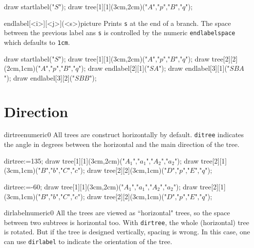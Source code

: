 \documentclass[11pt,a4paper,english]{article}
\begin{document}
\begin{exemple}[lefthand ratio = 0.65]
 draw startlabel("$S$");
 draw tree[1][1](3cm,2cm)("$A$","$p$","$B$","$q$");
\end{exemple}

\begin{rpobjet}{endlabel[<i>][<j>](<s>)}{picture}
Prints \verb|s| at the end of a branch. The space between the previous label ans \verb|s| is controlled by the numeric \verb|endlabelspace| which defaults to \verb|1cm|.
\end{rpobjet}

\begin{exemple}
 draw startlabel("$S$");
 draw tree[1][1](3cm,2cm)("$A$","$p$","$B$","$q$");
 draw tree[2][2](2cm,1cm)("$A$","$p$","$B$","$q$");
 draw endlabel[2][1]("$SA$");
 draw endlabel[3][1]("$SBA$");
 draw endlabel[3][2]("$SBB$");
\end{exemple}

\section{Direction}

\begin{mptparam}{dirtree}{numeric}{0}
All trees are construct horizontally by default. \verb|ditree| indicates the angle in degrees between the horizontal and the main direction of the tree.
\end{mptparam}

\begin{exemple}
dirtree:=135;
draw tree[1][1](3cm,2cm)("$A_1$","$a_1$","$A_2$","$a_2$");
draw tree[2][1](3cm,1cm)("$B$","$b$","$C$","$c$");
draw tree[2][2](3cm,1cm)("$D$","$p$","$E$","$q$");
\end{exemple}


\begin{exemple}
dirtree:=-60;
draw tree[1][1](3cm,2cm)("$A_1$","$a_1$","$A_2$","$a_2$");
draw tree[2][1](3cm,1cm)("$B$","$b$","$C$","$c$");
draw tree[2][2](3cm,1cm)("$D$","$p$","$E$","$q$");
\end{exemple}


\begin{mptparam}{dirlabel}{numeric}{0}
All the trees are viewed as ``horizontal" trees, so the space between two subtrees is horizontal too. With \verb|dirtree|, the whole (horizontal) tree is rotated. But if the tree is designed vertically, spacing is wrong. In this case, one can use \verb|dirlabel| to indicate the orientation of the tree.
\end{mptparam}
\end{document}
